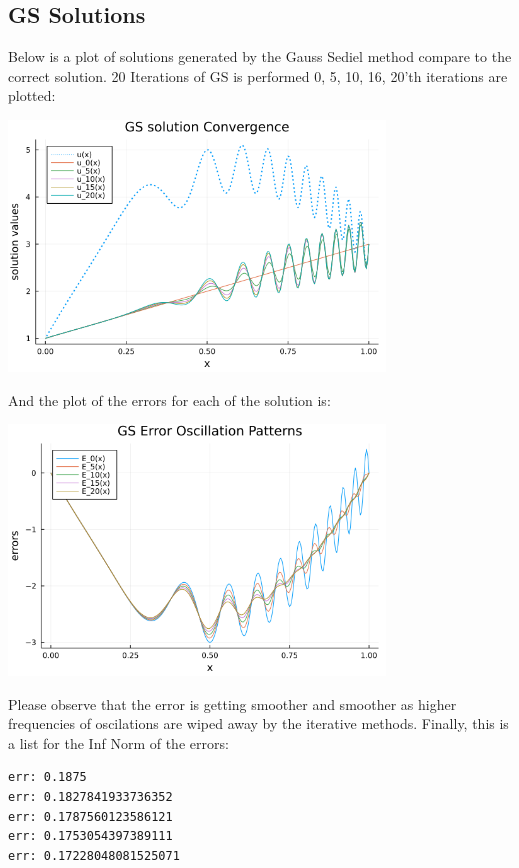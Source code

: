 \documentclass[]{article}
\begin{document}
    \subsection*{GS Solutions}
        Below is a plot of solutions generated by the Gauss Sediel method compare to the correct solution. 20 Iterations of GS is performed 0, 5, 10, 16, 20'th iterations are plotted: 
        \begin{center}
            \includegraphics[width=10cm]{p2_gs_solns.png}
        \end{center}
        And the plot of the errors for each of the solution is: 
        \begin{center}
            \includegraphics[width=10cm]{p2_gs_errors.png}
        \end{center}
        Please observe that the error is getting smoother and smoother as higher frequencies of oscilations are wiped away by the iterative methods. Finally, this is a list for the Inf Norm of the errors: 
        \begin{verbatim}
err: 0.1875
err: 0.1827841933736352
err: 0.1787560123586121
err: 0.1753054397389111
err: 0.17228048081525071
        \end{verbatim}
\end{document}
